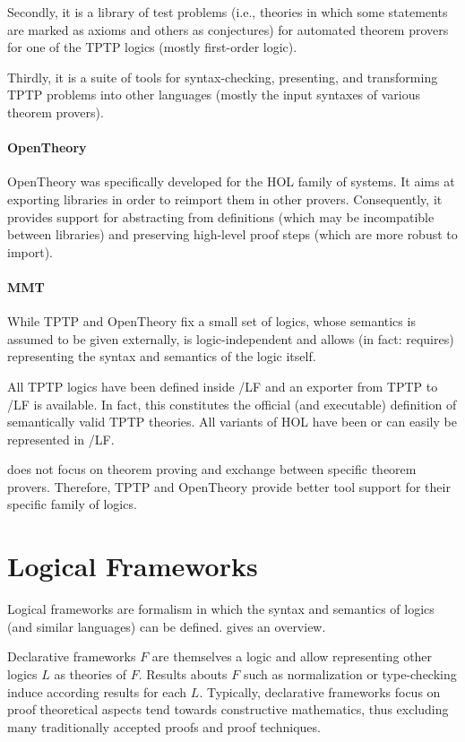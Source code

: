 \documentclass[12pt]{article}
\newcommand{\system}[2][]{\paragraph{#2}#2 \ifnonempty[\cite{#2}]{#1}{\cite{#1}}}
\begin{document}
Secondly, it is a library of test problems (i.e., theories in which some statements are marked as axioms and others as conjectures) for automated theorem provers for one of the TPTP logics (mostly first-order logic).

Thirdly, it is a suite of tools for syntax-checking, presenting, and transforming TPTP problems into other languages (mostly the input syntaxes of various theorem provers).

\system{OpenTheory} was specifically developed for the HOL family of systems.
It aims at exporting libraries in order to reimport them in other provers.
Consequently, it provides support for abstracting from definitions (which may be incompatible between libraries) and preserving high-level proof steps (which are more robust to import).

\paragraph{MMT}
While TPTP and OpenTheory fix a small set of logics, whose semantics is assumed to be given externally, \mmt is logic-independent and allows (in fact: requires) representing the syntax and semantics of the logic itself.

All TPTP logics have been defined inside \mmt/LF and an exporter from TPTP to \mmt/LF is available.
In fact, this constitutes the official (and executable) definition of semantically valid TPTP theories.
All variants of HOL have been or can easily be represented in \mmt/LF.

\mmt does not focus on theorem proving and exchange between specific theorem provers.
Therefore, TPTP and OpenTheory provide better tool support for their specific family of logics.

\section{Logical Frameworks}

Logical frameworks are formalism in which the syntax and semantics of logics (and similar languages) can be defined.
\cite{rabe:howto:14} gives an overview.

Declarative frameworks $F$ are themselves a logic and allow representing other logics $L$ as theories of $F$.
Results abouts $F$ such as normalization or type-checking induce according results for each $L$.
Typically, declarative frameworks focus on proof theoretical aspects tend towards constructive mathematics, thus excluding many traditionally accepted proofs and proof techniques.
\end{document}
